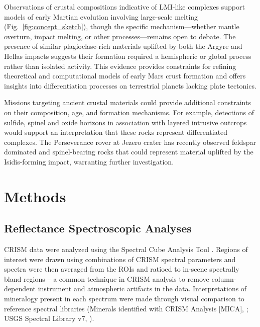 \documentclass[11pt]{article}
\begin{document}
Observations of crustal compositions indicative of LMI-like complexes support models of early Martian evolution involving large-scale melting (Fig.~\ref{fig:concept_sketch}), though the specific mechanism---whether mantle overturn, impact melting, or other processes---remains open to debate. The presence of similar plagioclase-rich materials uplifted by both the Argyre and Hellas impacts suggests their formation required a hemispheric or global process rather than isolated activity. This evidence provides constraints for refining theoretical and computational models of early Mars crust formation and offers insights into differentiation processes on terrestrial planets lacking plate tectonics.

Missions targeting ancient crustal materials could provide additional constraints on their composition, age, and formation mechanisms. For example, detections of sulfide, spinel and oxide horizons in association with layered intrusive outcrops would support an interpretation that these rocks represent differentiated complexes. The Perseverance rover at Jezero crater has recently observed feldspar dominated \citep{Bedford2024, Schmidt2025} and spinel-bearing rocks \citep{Mansbach2024, Bedford2024, Lawson2025} that could represent material uplifted by the Isidis-forming impact, warranting further investigation.

\section*{Methods}

\subsection*{Reflectance Spectroscopic Analyses}

CRISM data were analyzed using the Spectral Cube Analysis Tool \citep{Phillips2024}. Regions of interest were drawn using combinations of CRISM spectral parameters \citep{Viviano2014} and spectra were then averaged from the ROIs and ratioed to in-scene spectrally bland regions -- a common technique in CRISM analysis to remove column-dependent instrument and atmospheric artifacts in the data. Interpretations of mineralogy present in each spectrum were made through visual comparison to reference spectral libraries (Minerals identified with CRISM Analysis [MICA], \citealt{Viviano2014}; USGS Spectral Library v7, \citealt{Kokaly2017}).
\end{document}
